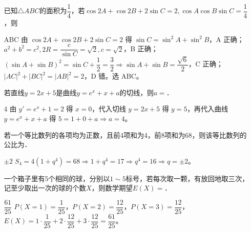 \documentclass[12pt,a4paper]{article}%
\begin{document}
\begin{question}
已知$\triangle ABC$的面积为$\dfrac{1}{4}$，若$\cos 2A+\cos 2B+2\sin C=2,\cos A\cos B\sin C=\dfrac{1}{4}$，则\choiceBox



\end{question}
\begin{answer}{ABC}
由 $\cos2A+\cos2B+2\sin C=2$ 得 $\sin C=\sin^2A+\sin^2B$，A 正确；$a^2+b^2=c^2,2R=\dfrac c{\sin C}=\sqrt2,c=\sqrt2$，B 正确；$(\sin A+\sin B)^2=\sin C+\dfrac12=\dfrac32\Rightarrow\sin A+\sin B=\dfrac{\sqrt6}{2}$，C 正确；$|AC|^2+|BC|^2=|AB|^2=2$，D 错。选 ABC。
\end{answer}



\begin{question}
若直线$y=2x+5$是曲线$y=e^x+x+a$的切线，则$a=$\blank{3cm}．

\end{question}
\begin{answer}{4}
由 $y'=e^x+1=2$ 得 $x=0$，代入切线 $y=2x+5$ 得 $y=5$，再代入曲线 $y=e^x+x+a$ 得 $5=1+0+a\Rightarrow a=4$。
\end{answer}

\begin{question}
若一个等比数列的各项均为正数，且前4项和为4，前8项和为68，则该等比数列的公比为\blank{3cm}．

\end{question}
\begin{answer}{$\pm2$}
$S_4=4(1+q^4)=68\Rightarrow1+q^4=17\Rightarrow q^4=16\Rightarrow q=\pm2$。
\end{answer}

\begin{question}
一个箱子里有5个相同的球，分别以$1\sim5$标号，若每次取一颗，有放回地取三次，记至少取出一次的球的个数$X$，则数学期望$E(X)=$\blank{3cm}．

\end{question}
\begin{answer}{$\dfrac{61}{25}$}
$P(X=1)=\dfrac1{25}$，$P(X=2)=\dfrac{12}{25}$，$P(X=3)=\dfrac{12}{25}$，$E(X)=1\cdot\dfrac1{25}+2\cdot\dfrac{12}{25}+3\cdot\dfrac{12}{25}=\dfrac{61}{25}$。
\end{answer}
\end{document}
